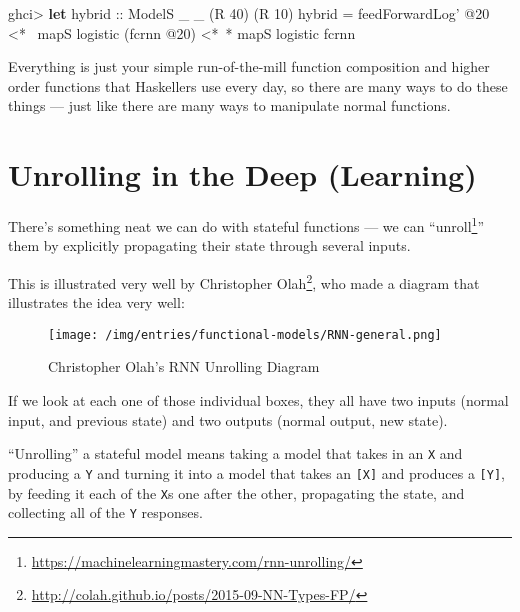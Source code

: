 \documentclass[]{article}
\newenvironment{Shaded}{}{}
\newcommand{\DataTypeTok}[1]{\textcolor[rgb]{0.56,0.13,0.00}{#1}}
\newcommand{\DecValTok}[1]{\textcolor[rgb]{0.25,0.63,0.44}{#1}}
\newcommand{\FunctionTok}[1]{\textcolor[rgb]{0.02,0.16,0.49}{#1}}
\newcommand{\KeywordTok}[1]{\textcolor[rgb]{0.00,0.44,0.13}{\textbf{#1}}}
\newcommand{\NormalTok}[1]{#1}
\newcommand{\OtherTok}[1]{\textcolor[rgb]{0.00,0.44,0.13}{#1}}
\renewcommand{\href}[2]{#2\footnote{\url{#1}}}
\begin{document}
\begin{Shaded}
\begin{Highlighting}[]
\NormalTok{ghci}\FunctionTok{>} \KeywordTok{let}\OtherTok{ hybrid ::} \DataTypeTok{ModelS}\NormalTok{ _ _ (}\DataTypeTok{R} \DecValTok{40}\NormalTok{) (}\DataTypeTok{R} \DecValTok{10}\NormalTok{)}
\NormalTok{          hybrid }\FunctionTok{=}\NormalTok{ feedForwardLog' }\FunctionTok{@}\DecValTok{20}
              \FunctionTok{<*~}\NormalTok{  mapS logistic (fcrnn }\FunctionTok{@}\DecValTok{20}\NormalTok{)}
              \FunctionTok{<*~*}\NormalTok{ mapS logistic fcrnn}
\end{Highlighting}
\end{Shaded}

Everything is just your simple run-of-the-mill function composition and higher
order functions that Haskellers use every day, so there are many ways to do
these things --- just like there are many ways to manipulate normal functions.

\hypertarget{unrolling-in-the-deep-learning}{%
\section{Unrolling in the Deep
(Learning)}\label{unrolling-in-the-deep-learning}}

There's something neat we can do with stateful functions --- we can
``\href{https://machinelearningmastery.com/rnn-unrolling/}{unroll}'' them by
explicitly propagating their state through several inputs.

This is illustrated very well by
\href{http://colah.github.io/posts/2015-09-NN-Types-FP/}{Christopher Olah}, who
made a diagram that illustrates the idea very well:

\begin{figure}
\centering
\texttt{[image: /img/entries/functional-models/RNN-general.png]}
\caption{Christopher Olah's RNN Unrolling Diagram}
\end{figure}

If we look at each one of those individual boxes, they all have two inputs
(normal input, and previous state) and two outputs (normal output, new state).

``Unrolling'' a stateful model means taking a model that takes in an \texttt{X}
and producing a \texttt{Y} and turning it into a model that takes an
\texttt{{[}X{]}} and produces a \texttt{{[}Y{]}}, by feeding it each of the
\texttt{X}s one after the other, propagating the state, and collecting all of
the \texttt{Y} responses.
\end{document}
